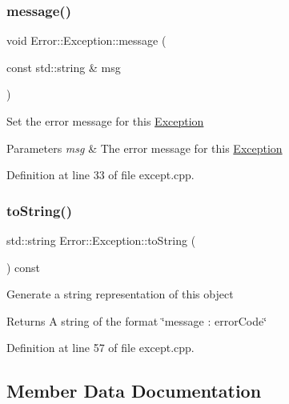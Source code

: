 \subsubsection{\texorpdfstring{message()}{message()}\hspace{0.1cm}{\footnotesize\ttfamily [2/2]}}
{\footnotesize\ttfamily void Error\+::\+Exception\+::message (\begin{DoxyParamCaption}\item[{const std\+::string \&}]{msg }\end{DoxyParamCaption})\hspace{0.3cm}{\ttfamily [virtual]}}

Set the error message for this \hyperlink{class_error_1_1_exception}{Exception} 
\begin{DoxyParams}{Parameters}
{\em msg} & The error message for this \hyperlink{class_error_1_1_exception}{Exception} \\
\hline
\end{DoxyParams}


Definition at line 33 of file except.\+cpp.

\hypertarget{class_error_1_1_exception_a36cabfb6ea6390290ab4d67a6a30cca1}{}\label{class_error_1_1_exception_a36cabfb6ea6390290ab4d67a6a30cca1} 
\subsubsection{\texorpdfstring{to\+String()}{toString()}}
{\footnotesize\ttfamily std\+::string Error\+::\+Exception\+::to\+String (\begin{DoxyParamCaption}{ }\end{DoxyParamCaption}) const\hspace{0.3cm}{\ttfamily [virtual]}}

Generate a string representation of this object \begin{DoxyReturn}{Returns}
A string of the format \char`\"{}message \+: error\+Code\char`\"{} 
\end{DoxyReturn}


Definition at line 57 of file except.\+cpp.



\subsection{Member Data Documentation}
\hypertarget{class_error_1_1_exception_a3f15b05b9087dd84715995e7c94c7492}{}\label{class_error_1_1_exception_a3f15b05b9087dd84715995e7c94c7492} 

